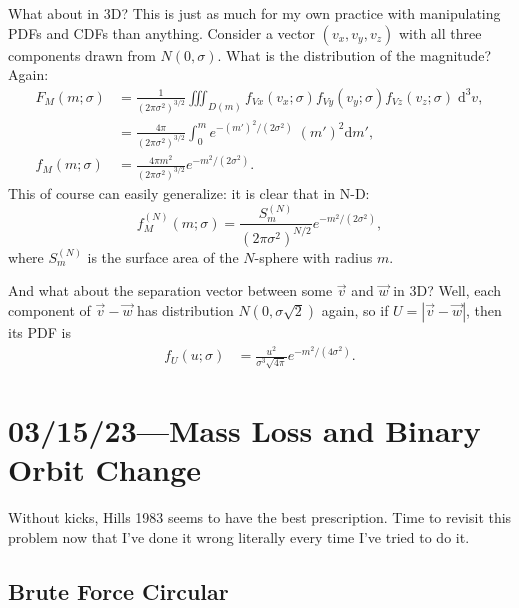 \documentclass[12pt]{article}
\newcommand*{\abs}[1]{\left|#1\right|}
\newcommand*{\p}[1]{\left(#1\right)}
\begin{document}
What about in 3D\@? This is just as much for my own practice with manipulating
PDFs and CDFs than anything. Consider a vector $\p{v_x, v_y, v_z}$ with all
three components drawn from $N\p{0, \sigma}$. What is the distribution of the
magnitude? Again:
\begin{align}
    F_M(m; \sigma)
        &= \frac{1}{(2\pi \sigma^2)^{3/2}}\iiint_{D(m)}
            f_{Vx}\p{v_x; \sigma}
            f_{Vy}\p{v_y; \sigma}
            f_{Vz}\p{v_z; \sigma}\;\mathrm{d}^3v,\\
        &= \frac{4\pi}{(2\pi \sigma^2)^{3/2}}\int_0^m
            e^{-(m')^2/(2\sigma^2)}\;(m')^2\mathrm{d}m',\\
    f_M(m; \sigma) &= \frac{4\pi m^2}{\p{2\pi \sigma^2}^{3/2}}
            e^{-m^2/(2\sigma^2)}.
\end{align}
This of course can easily generalize: it is clear that in N-D\@:
\begin{equation}
    f^{(N)}_M(m; \sigma)
        = \frac{S^{(N)}_m}{\p{2\pi \sigma^2}^{N / 2}}
            e^{-m^2 / (2\sigma^2)},
\end{equation}
where $S^{(N)}_m$ is the surface area of the $N$-sphere with radius $m$.

And what about the separation vector between some $\vec{v}$ and $\vec{w}$ in
3D\@? Well, each component of $\vec{v} - \vec{w}$ has distribution $N\p{0,
\sigma \sqrt{2}}$ again, so if $U = \abs{\vec{v} - \vec{w}}$, then its PDF is
\begin{align}
    f_U(u; \sigma)
        &= \frac{u^2}{\sigma^3\sqrt{4\pi}}
            e^{-m^2 / (4\sigma^2)}.
\end{align}

\section{03/15/23---Mass Loss and Binary Orbit Change}

Without kicks, Hills 1983 seems to have the best prescription. Time to revisit
this problem now that I've done it wrong literally every time I've tried to do
it.

\subsection{Brute Force Circular}
\end{document}
